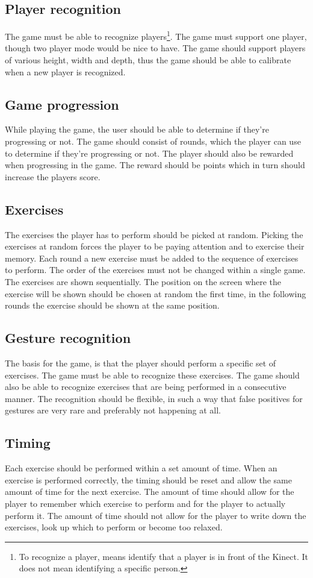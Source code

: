 \documentclass[11pt]{report}
\begin{document}
\subsection{Player recognition}
The game must be able to recognize players\footnote{ To recognize a player, means identify that a player is in front of the Kinect. It does not mean identifying a specific person.}. The game must support one player, though two player mode would be nice to have. The game should support players of various height, width and depth, thus the game should be able to calibrate when a new player is recognized.

\subsection{Game progression}
While playing the game, the user should be able to determine if they're progressing or not. The game should consist of rounds, which the player can use to determine if they're progressing or not. The player should also be rewarded when progressing in the game. The reward should be points which in turn should increase the players score.

\subsection{Exercises}
The exercises the player has to perform should be picked at random. Picking the exercises at random forces the player to be paying attention and to exercise their memory. Each round a new exercise must be added to the sequence of exercises to perform. The order of the exercises must not be changed within a single game. The exercises are shown sequentially. The position on the screen where the exercise will be shown should be chosen at random the first time, in the following rounds the exercise should be shown at the same position.

\subsection{Gesture recognition}
The basis for the game, is that the player should perform a specific set of exercises. The game must be able to recognize these exercises. The game should also be able to recognize exercises that are being performed in a consecutive manner. The recognition should be flexible, in such a way that false positives for gestures are very rare and preferably not happening at all.

\subsection{Timing}
Each exercise should be performed within a set amount of time. When an exercise is performed correctly, the timing should be reset and allow the same amount of time for the next exercise. The amount of time should allow for the player to remember which exercise to perform and for the player to actually perform it. The amount of time should not allow for the player to write down the exercises, look up which to perform or become too relaxed.
\end{document}
